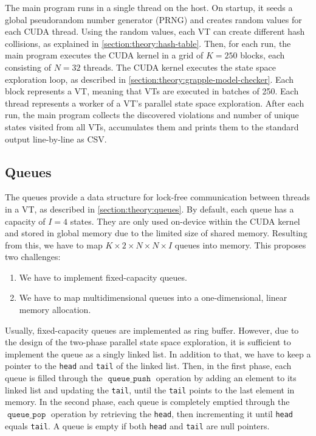 \documentclass[
fancyheadings, %
%
%
]{stsreprt}
\DeclareMathOperator{\qPop}{\texttt{queue\_pop}}
\DeclareMathOperator{\qPush}{\texttt{queue\_push}}
\begin{document}
The main program runs in a single thread on the host.
On startup, it seeds a global pseudorandom number generator (PRNG) and creates random values for each CUDA thread.
Using the random values, each VT can create different hash collisions, as explained in \cref{section:theory:hash-table}.
Then, for each run, the main program executes the CUDA kernel in a grid of $K=250$ blocks, each consisting of $N=32$ threads.
The CUDA kernel executes the state space exploration loop, as described in \cref{section:theory:grapple-model-checker}.
Each block represents a VT, meaning that VTs are executed in batches of 250.
Each thread represents a worker of a VT's parallel state space exploration.
After each run, the main program collects the discovered violations and number of unique states visited from all VTs, accumulates them and prints them to the standard output line-by-line as CSV.

\subsection{Queues}
\label{section:implementation:queues}

The queues provide a data structure for lock-free communication between threads in a VT, as described in \cref{section:theory:queues}.
By default, each queue has a capacity of $I=4$ states.
They are only used on-device within the CUDA kernel and stored in global memory due to the limited size of shared memory.
Resulting from this, we have to map $K \times 2 \times N \times N \times I$ queues into memory.
This proposes two challenges:

\begin{enumerate}
    \item We have to implement fixed-capacity queues.
    \item We have to map multidimensional queues into a one-dimensional, linear memory allocation.
\end{enumerate}

Usually, fixed-capacity queues are implemented as ring buffer.
However, due to the design of the two-phase parallel state space exploration, it is sufficient to implement the queue as a singly linked list.
In addition to that, we have to keep a pointer to the \texttt{head} and \texttt{tail} of the linked list.
Then, in the first phase, each queue is filled through the $\qPush$ operation by adding an element to its linked list and updating the \texttt{tail}, until the \texttt{tail} points to the last element in memory.
In the second phase, each queue is completely emptied through the $\qPop$ operation by retrieving the \texttt{head}, then incrementing it until \texttt{head} equals \texttt{tail}.
A queue is empty if both \texttt{head} and \texttt{tail} are null pointers.
\end{document}
